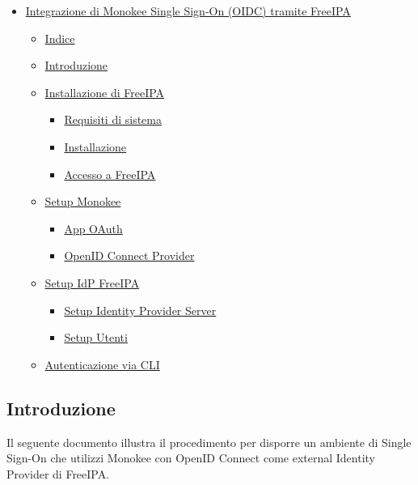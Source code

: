 \begin{itemize}
\tightlist
\item
  \protect\hyperlink{integrazione-di-monokee-single-sign-on-oidc-tramite-freeipa}{Integrazione
  di Monokee Single Sign-On (OIDC) tramite FreeIPA}

  \begin{itemize}
  \tightlist
  \item
    \protect\hyperlink{indice}{Indice}
  \item
    \protect\hyperlink{introduzione-guida}{Introduzione}
  \item
    \protect\hyperlink{installazione-di-freeipa}{Installazione di
    FreeIPA}

    \begin{itemize}
    \tightlist
    \item
      \protect\hyperlink{requisiti-di-sistema}{Requisiti di sistema}
    \item
      \protect\hyperlink{installazione}{Installazione}
    \item
      \protect\hyperlink{accesso-a-freeipa}{Accesso a FreeIPA}
    \end{itemize}
  \item
    \protect\hyperlink{setup-monokee}{Setup Monokee}

    \begin{itemize}
    \tightlist
    \item
      \protect\hyperlink{app-oauth}{App OAuth}
    \item
      \protect\hyperlink{openid-connect-provider}{OpenID Connect
      Provider}
    \end{itemize}
  \item
    \protect\hyperlink{setup-idp-freeipa}{Setup IdP FreeIPA}

    \begin{itemize}
    \tightlist
    \item
    \protect\hyperlink{setup-identity-provider-server}{Setup Identity
    Provider Server}
    \item
    \protect\hyperlink{setup-utenti}{Setup Utenti}
  \end{itemize}
  \item
  \protect\hyperlink{autenticazione-via-cli}{Autenticazione via CLI}
\end{itemize}
\end{itemize}


\hypertarget{introduzione-guida}{%
\subsection{Introduzione}\label{introduzione-guida}}
Il seguente documento illustra il procedimento per disporre un ambiente di Single Sign-On che utilizzi Monokee con OpenID Connect come external Identity Provider di FreeIPA.

